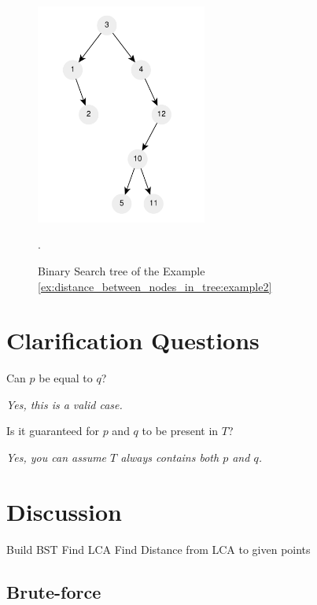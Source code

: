 \begin{figure}
	\centering
	\includegraphics[width=0.5\textwidth]{sources/distance_between_nodes_in_tree/images/example2}
	\caption{Binary Search tree of the Example
	\ref{ex:distance_between_nodes_in_tree:example2}}.
	\label{fig:distance_between_nodes_in_tree:example2}
\end{figure}

\section{Clarification Questions}

\begin{QandA}
	\item Can $p$ be equal to $q$?
	\begin{answered}
		\textit{Yes, this is a valid case.}
	\end{answered}
	
	\item Is it guaranteed for  $p$ and  $q$ to be present in $T$?
	\begin{answered}
		\textit{Yes, you can assume $T$ always contains both $p$ and $q$.}
	\end{answered}

\end{QandA}

\section{Discussion}
\label{distance_between_nodes_in_tree:sec:discussion}

Build BST
Find LCA
Find Distance from LCA to given points
\subsection{Brute-force}
\label{distance_between_nodes_in_tree:sec:bruteforce}



